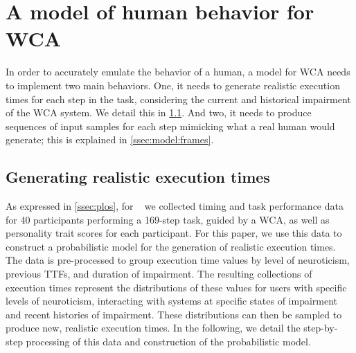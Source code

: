 \section{A model of human behavior for \ac{WCA}}\label{sec:model}


In order to accurately emulate the behavior of a human, a model for \ac{WCA} needs to implement two main behaviors.
One, it needs to generate realistic execution times for each step in the task, considering the current and historical impairment of the \ac{WCA} system.
We detail this in \cref{ssec:model:exectimes}.
And two, it needs to produce sequences of input samples for each step mimicking what a real human would generate; this is explained in \cref{ssec:model:frames}.

\subsection{Generating realistic execution times}\label{ssec:model:exectimes}

As expressed in \cref{ssec:plos}, for ~\cite{olguinmunoz:impact2021} we collected timing and task performance data for \num{40} participants performing a \num{169}-step task, guided by a \ac{WCA}, as well as personality trait scores for each participant.
For this paper, we use this data to construct a probabilistic model for the generation of realistic execution times.
The data is pre-processed to group execution time values by level of neuroticism, previous \acp{TTF}, and duration of impairment.
The resulting collections of execution times represent the distributions of these values for users with specific levels of neuroticism, interacting with systems at specific states of impairment and recent histories of impairment.
These distributions can then be sampled to produce new, realistic execution times.
In the following, we detail the step-by-step processing of this data and construction of the probabilistic model.

